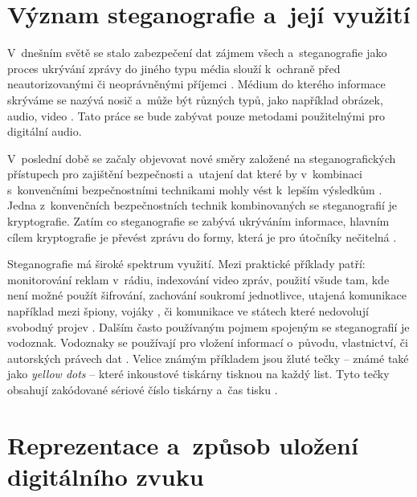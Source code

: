 \section{Význam steganografie a~její využití}
\label{sec:motivation-and-uses}

V~dnešním světě se stalo zabezpečení dat zájmem všech a~steganografie jako
proces ukrývání zprávy do jiného typu média slouží k~ochraně před
neautorizovanými či neoprávněnými příjemci \cite{Dutta2020}. Médium do kterého
informace skrýváme se nazývá nosič a~může být různých typů, jako například
obrázek, audio, video \cite{Dutta2020}. Tato práce se bude zabývat pouze
metodami použitelnými pro digitální audio.

V~poslední době se začaly objevovat nové směry založené na steganografických
přístupech pro zajištění bezpečnosti a~utajení dat které by v~kombinaci
s~konvenčními bezpečnostními technikami mohly vést k~lepším výsledkům
\cite{Djebbar2012}. Jedna z~konvenčních bezpečnostních technik kombinovaných se
steganografií je kryptografie. Zatím co steganografie se zabývá ukrýváním
informace, hlavním cílem kryptografie je převést zprávu do formy, která je pro
útočníky nečitelná \cite{AlSabhany2020}.

Steganografie má široké spektrum využití. Mezi praktické příklady patří:
monitorování reklam v~rádiu, indexování video zpráv, použití všude tam, kde
není možné použít šifrování, zachování soukromí jednotlivce, utajená komunikace
například mezi špiony, vojáky \cite{Dutta2020}, či komunikace ve státech které
nedovolují svobodný projev \cite{Anderson1998}. Dalším často používaným pojmem
spojeným se steganografií je vodoznak. Vodoznaky se používají pro vložení
informací o~původu, vlastnictví, či autorských právech dat
\cite{Anderson1998}\cite{Djebbar2012}\cite{Dutta2020}. Velice známým příkladem
jsou žluté tečky -- známé také jako \textit{yellow dots} -- které inkoustové
tiskárny tisknou na každý list. Tyto tečky obsahují zakódované sériové číslo
tiskárny a~čas tisku \cite{Dutta2020}.


\blindtext

\section{Reprezentace a~způsob uložení digitálního zvuku}
\label{sec:digital-sound-representation}


